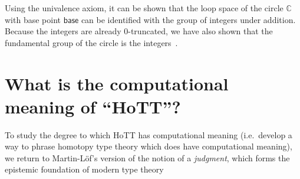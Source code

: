 \documentclass{article}
\newcommand\Circle{\mathbb{C}}
\newcommand\Base{\mathsf{base}}
\begin{document}
Using the univalence axiom, it can be shown that the loop space of the
circle $\Circle$ with base point $\Base$ can be identified with the
group of integers under addition. Because the integers are already
0-truncated, we have also shown that the fundamental group of the
circle is the integers~\citep{Licata-Shulman:13}.


\section{What is the computational meaning of ``HoTT''?}

To study the degree to which HoTT has computational meaning (i.e.\
develop a way to phrase homotopy type theory which does have
computational meaning), we return to Martin-L\"of's version of the
notion of a \emph{judgment}, which forms the epistemic foundation of
modern type theory~\citep{MartinLof:87,MartinLof:94,MartinLof:96}

\nocite{HoTTBook:13}


\end{document}
